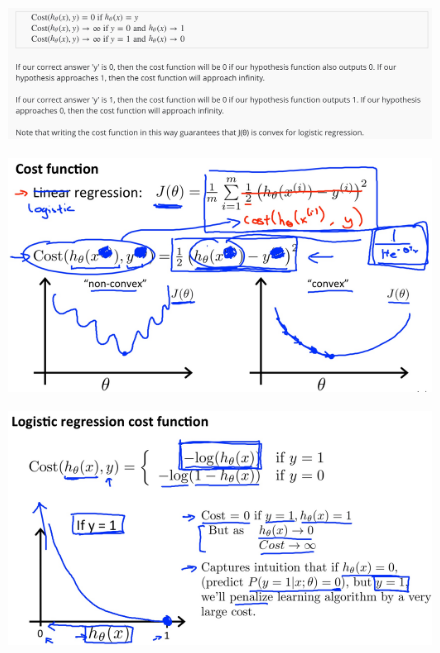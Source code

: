 \documentclass[12pt, A4,onecolumn]{article} %
\begin{document}
\begin{figure}[H]
	\centering
	\includegraphics[width=1\textwidth]{./Imagenes/costFunc4}
\end{figure}

\begin{figure}[H]
	\centering
	\includegraphics[width=1\textwidth]{./Imagenes/costFunc5}
\end{figure}

\begin{figure}[H]
	\centering
	\includegraphics[width=1\textwidth]{./Imagenes/costFunc6}
\end{figure}
\end{document}

